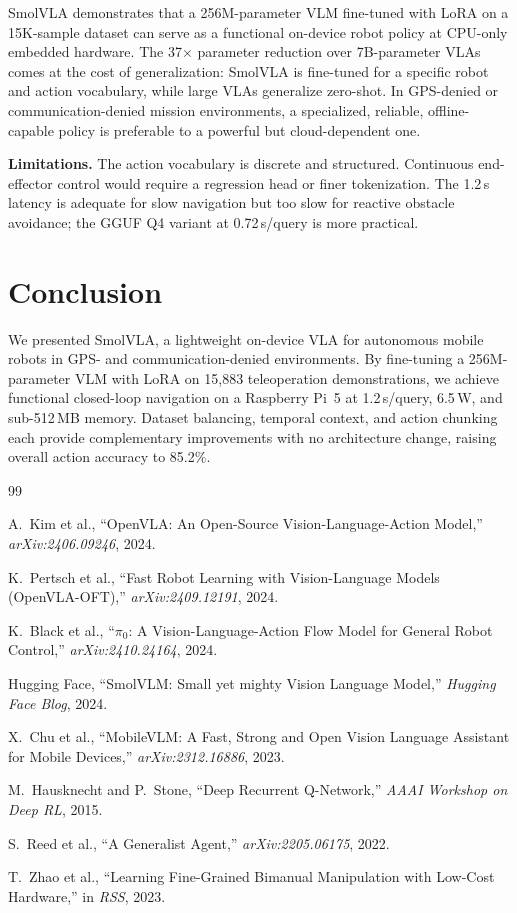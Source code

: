 \documentclass[conference]{IEEEtran}
\begin{document}
SmolVLA demonstrates that a 256M-parameter VLM fine-tuned with LoRA on a 15K-sample dataset
can serve as a functional on-device robot policy at CPU-only embedded hardware. The 37$\times$
parameter reduction over 7B-parameter VLAs comes at the cost of generalization: SmolVLA is
fine-tuned for a specific robot and action vocabulary, while large VLAs generalize zero-shot.
In GPS-denied or communication-denied mission environments, a specialized, reliable, offline-
capable policy is preferable to a powerful but cloud-dependent one.

\textbf{Limitations.} The action vocabulary is discrete and structured. Continuous
end-effector control would require a regression head or finer tokenization. The 1.2\,s latency
is adequate for slow navigation but too slow for reactive obstacle avoidance; the GGUF Q4
variant at 0.72\,s/query is more practical.

\section{Conclusion}
\label{sec:conclusion}

We presented SmolVLA, a lightweight on-device VLA for autonomous mobile robots in GPS- and
communication-denied environments. By fine-tuning a 256M-parameter VLM with LoRA on 15,883
teleoperation demonstrations, we achieve functional closed-loop navigation on a Raspberry Pi~5
at 1.2\,s/query, 6.5\,W, and sub-512\,MB memory. Dataset balancing, temporal context, and
action chunking each provide complementary improvements with no architecture change, raising
overall action accuracy to 85.2\%.

\begin{thebibliography}{99}

  A.~Kim et al., ``OpenVLA: An Open-Source Vision-Language-Action Model,''
  \textit{arXiv:2406.09246}, 2024.

  K.~Pertsch et al., ``Fast Robot Learning with Vision-Language Models (OpenVLA-OFT),''
  \textit{arXiv:2409.12191}, 2024.

  K.~Black et al., ``$\pi_0$: A Vision-Language-Action Flow Model for General Robot Control,''
  \textit{arXiv:2410.24164}, 2024.

  Hugging Face, ``SmolVLM: Small yet mighty Vision Language Model,''
  \textit{Hugging Face Blog}, 2024.

  X.~Chu et al., ``MobileVLM: A Fast, Strong and Open Vision Language Assistant for Mobile
  Devices,'' \textit{arXiv:2312.16886}, 2023.

  M.~Hausknecht and P.~Stone, ``Deep Recurrent Q-Network,''
  \textit{AAAI Workshop on Deep RL}, 2015.

  S.~Reed et al., ``A Generalist Agent,'' \textit{arXiv:2205.06175}, 2022.

  T.~Zhao et al., ``Learning Fine-Grained Bimanual Manipulation with Low-Cost Hardware,''
  in \textit{RSS}, 2023.

\end{thebibliography}
\end{document}
